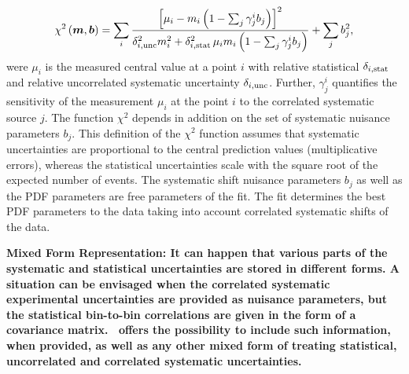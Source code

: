 \begin{description}
{ \small
\begin{equation} 
    \chi^2\left(\boldsymbol{m},\boldsymbol{b}\right) =   
 \sum_i \frac{\left[ {\mu_i} - m_i \left( 1 - \sum_j \gamma^i_j b_j \right) \right]^2}
{ \textstyle \delta^2_{i,{\rm unc}}m_i^2 + \delta^2_{i,{\rm stat}}\, {\mu_i} m_i \left(1 - \sum_j \gamma^i_j b_j\right) }
  + \sum_j b^2_j,
\label{eq:aven}
\end{equation}}
%
were ${\mu_i}$ is the  measured central value  at a point $i$ 
with  relative statistical $\delta_{i,\rm stat}$ 
and relative uncorrelated systematic uncertainty $\delta_{i,\rm unc}$.
Further, 
$\gamma^i_j$ 
quantifies the sensitivity of the
measurement ${\mu_i}$ at the point $i$ to the correlated systematic 
source $j$. The function $\chi^2$ depends in addition on
 the set of systematic nuisance parameters $b_j$.
This definition of the $\chi^2$ function assumes that
systematic uncertainties are proportional to the central prediction values
(multiplicative errors), whereas the statistical uncertainties scale 
with the square root of the expected number of events. 
The systematic shift nuisance parameters $b_j$ as well as the PDF 
parameters are free parameters of the fit. 
The fit determines the best PDF parameters to
the data taking into account correlated systematic shifts of the data. 
\item  \bf{Mixed Form Representation:} \rm
It can happen that various parts of the systematic and statistical uncertainties are stored in different forms. A situation can be envisaged when the correlated systematic experimental uncertainties are provided as nuisance parameters, but the statistical bin-to-bin correlations are given in the form of a covariance matrix. \fitter\ offers the possibility to include such information, when provided, as well as any other mixed form of treating statistical, uncorrelated and correlated systematic uncertainties. 

\end{description}
